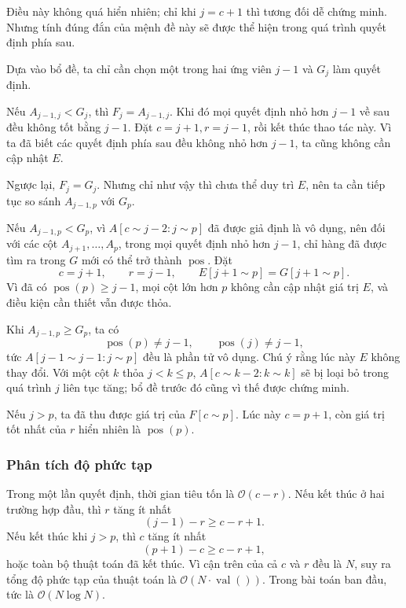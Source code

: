 \documentclass[11pt]{article}
\newcommand{\Oh}{\mathcal{O}}
\begin{document}
Điều này không quá hiển nhiên; chỉ khi \(j=c+1\) thì tương đối dễ chứng minh.
Nhưng tính đúng đắn của mệnh đề này sẽ được thể hiện trong quá trình quyết
định phía sau.

Dựa vào bổ đề, ta chỉ cần chọn một trong hai ứng viên \(j-1\) và \(G_j\) làm
quyết định.

Nếu \(A_{j-1,j}<G_j\), thì \(F_j=A_{j-1,j}\). Khi đó mọi quyết định nhỏ hơn
\(j-1\) về sau đều không tốt bằng \(j-1\). Đặt \(c=j+1,r=j-1\), rồi kết thúc
thao tác này. Vì ta đã biết các quyết định phía sau đều không nhỏ hơn \(j-1\),
ta cũng không cần cập nhật \(E\).

Ngược lại, \(F_j=G_j\). Nhưng chỉ như vậy thì chưa thể duy trì \(E\), nên ta
cần tiếp tục so sánh \(A_{j-1,p}\) với \(G_p\).

Nếu \(A_{j-1,p}<G_p\), vì \(A[c\sim j-2:j\sim p]\) đã được giả định là vô
dụng, nên đối với các cột \(A_{j+1},\ldots,A_p\), trong mọi quyết định nhỏ hơn
\(j-1\), chỉ hàng đã được tìm ra trong \(G\) mới có thể trở thành
\(\operatorname{pos}\). Đặt
\[
  c=j+1,\qquad r=j-1,\qquad E[j+1\sim p]=G[j+1\sim p].
\]
Vì đã có \(\operatorname{pos}(p)\ge j-1\), mọi cột lớn hơn \(p\) không cần cập
nhật giá trị \(E\), và điều kiện cần thiết vẫn được thỏa.

Khi \(A_{j-1,p}\ge G_p\), ta có
\[
  \operatorname{pos}(p)\ne j-1,\qquad \operatorname{pos}(j)\ne j-1,
\]
tức \(A[j-1\sim j-1:j\sim p]\) đều là phần tử vô dụng. Chú ý rằng lúc này
\(E\) không thay đổi. Với một cột \(k\) thỏa \(j<k\le p\),
\(A[c\sim k-2:k\sim k]\) sẽ bị loại bỏ trong quá trình \(j\) liên tục tăng;
bổ đề trước đó cũng vì thế được chứng minh.

Nếu \(j>p\), ta đã thu được giá trị của \(F[c\sim p]\). Lúc này
\(c=p+1\), còn giá trị tốt nhất của \(r\) hiển nhiên là
\(\operatorname{pos}(p)\).

\subsubsection{Phân tích độ phức tạp}

Trong một lần quyết định, thời gian tiêu tốn là \(\Oh(c-r)\). Nếu kết thúc ở
hai trường hợp đầu, thì \(r\) tăng ít nhất
\[
  (j-1)-r\ge c-r+1.
\]
Nếu kết thúc khi \(j>p\), thì \(c\) tăng ít nhất
\[
  (p+1)-c\ge c-r+1,
\]
hoặc toàn bộ thuật toán đã kết thúc. Vì cận trên của cả \(c\) và \(r\) đều là
\(N\), suy ra tổng độ phức tạp của thuật toán là \(\Oh(N\cdot\operatorname{val}())\).
Trong bài toán ban đầu, tức là \(\Oh(N\log N)\).
\end{document}
